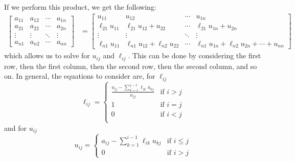 \documentclass{article}
\begin{document}
If we perform this product, we get the following:
\begin{align*}
    \begin{bmatrix*}
        a_{11} & a_{12} & \cdots & a_{1n} \\
        a_{21} & a_{22} & \cdots & a_{2n} \\
        \vdots & \vdots & \ddots & \vdots \\
        a_{n1} & a_{n2} & \cdots & a_{nn}
    \end{bmatrix*}
     & =
    \begin{bmatrix*}
        u_{11}        & u_{12} & \cdots & u_{1n} \\
        \ell_{21} u_{11} & \ell_{21} u_{12} + u_{22} & \cdots & \ell_{21} u_{1n} + u_{2n} \\
        \vdots        & \vdots & \ddots & \vdots \\
        \ell_{n1} u_{11} & \ell_{n1} u_{12} + \ell_{n2} u_{22} & \cdots & \ell_{n1} u_{1n} + \ell_{n2} u_{2n} + \cdots + u_{nn}
    \end{bmatrix*}
\end{align*}
which allows us to solve for \(u_{ij}\) and \(\ell_{ij}\). This can be
done by considering the first row, then the first column, then the
second row, then the second column, and so on. In general, the equations
to consider are, for \(\ell_{ij}\)
\begin{equation*}
    \ell_{ij} =
    \begin{cases}
        \frac{a_{ij} - \sum_{k = 1}^{j - 1} \ell_{ik} u_{kj}}{u_{jj}} & \text{if \(i > j\)} \\
        1                                                             & \text{if \(i = j\)} \\
        0                                                             & \text{if \(i < j\)} \\
    \end{cases}
\end{equation*}
and for \(u_{ij}\)
\begin{equation*}
    u_{i j} =
    \begin{cases}
        a_{ij} - \sum_{k = 1}^{i - 1} \ell_{ik} u_{kj} & \text{if \(i \leq j\)} \\
        0                                              & \text{if \(i > j\)}
    \end{cases}
\end{equation*}
\end{document}
